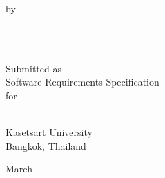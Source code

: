 \pagestyle{empty}
\thispagestyle{empty}  %

 
        \begin{center}
        \vspace*{1.0cm}

        \Huge
         

            \begin{center}
              \Huge  \bfseries
              \thesistitlecoverpage
            \end{center}
            \vskip5pt
        \vfill


        \vspace*{1.0cm}

        \normalsize
        by \\

        \vspace*{1.0cm}

        \Large
        \thesisauthor \\
        \thesecondsisauthor \\

        \vspace*{3.0cm}

        \normalsize
        Submitted as\\
        Software Requirements Specification \\
        for\\
        \nameofprogram

        \vspace*{2.0cm}

        \faculty\\
        Kasetsart University\\
        Bangkok, Thailand

        \vspace*{2.0cm}
        March \the\year\\
        \end{center}
 


\pagestyle{plain}
\setcounter{page}{2}

\cleardoublepage %
